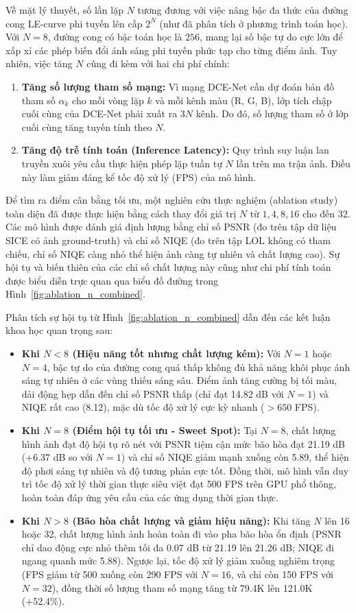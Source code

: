 \documentclass[a4paper]{article}
\begin{document}
Về mặt lý thuyết, số lần lặp $N$ tương đương với việc nâng bậc đa thức của đường cong LE-curve phi tuyến lên cấp $2^N$ (như đã phân tích ở phương trình toán học). Với $N=8$, đường cong có bậc toán học là $256$, mang lại số bậc tự do cực lớn để xấp xỉ các phép biến đổi ánh sáng phi tuyến phức tạp cho từng điểm ảnh. Tuy nhiên, việc tăng $N$ cũng đi kèm với hai chi phí chính:
\begin{enumerate}
    \item \textbf{Tăng số lượng tham số mạng:} Vì mạng DCE-Net cần dự đoán bản đồ tham số $\alpha_k$ cho mỗi vòng lặp $k$ và mỗi kênh màu (R, G, B), lớp tích chập cuối cùng của DCE-Net phải xuất ra $3N$ kênh. Do đó, số lượng tham số ở lớp cuối cùng tăng tuyến tính theo $N$.
    \item \textbf{Tăng độ trễ tính toán (Inference Latency):} Quy trình suy luận lan truyền xuôi yêu cầu thực hiện phép lặp tuần tự $N$ lần trên ma trận ảnh. Điều này làm giảm đáng kể tốc độ xử lý (FPS) của mô hình.
\end{enumerate}

Để tìm ra điểm cân bằng tối ưu, một nghiên cứu thực nghiệm (ablation study) toàn diện đã được thực hiện bằng cách thay đổi giá trị $N$ từ $1, 4, 8, 16$ cho đến $32$. Các mô hình được đánh giá định lượng bằng chỉ số PSNR (đo trên tập dữ liệu SICE có ảnh ground-truth) và chỉ số NIQE (đo trên tập LOL không có tham chiếu, chỉ số NIQE càng nhỏ thể hiện ảnh càng tự nhiên và chất lượng cao). Sự hội tụ và biến thiên của các chỉ số chất lượng này cũng như chi phí tính toán được biểu diễn trực quan qua biểu đồ đường trong Hình~\ref{fig:ablation_n_combined}.

Phân tích sự hội tụ từ Hình~\ref{fig:ablation_n_combined} dẫn đến các kết luận khoa học quan trọng sau:
\begin{itemize}
    \item \textbf{Khi $N < 8$ (Hiệu năng tốt nhưng chất lượng kém):} Với $N=1$ hoặc $N=4$, bậc tự do của đường cong quá thấp không đủ khả năng khôi phục ánh sáng tự nhiên ở các vùng thiếu sáng sâu. Điểm ảnh tăng cường bị tối màu, dải động hẹp dẫn đến chỉ số PSNR thấp (chỉ đạt 14.82 dB với $N=1$) và NIQE rất cao (8.12), mặc dù tốc độ xử lý cực kỳ nhanh ($>650$ FPS).
    \item \textbf{Khi $N = 8$ (Điểm hội tụ tối ưu - Sweet Spot):} Tại $N=8$, chất lượng hình ảnh đạt độ hội tụ rõ nét với PSNR tiệm cận mức bão hòa đạt 21.19 dB (+6.37 dB so với $N=1$) và chỉ số NIQE giảm mạnh xuống còn 5.89, thể hiện độ phơi sáng tự nhiên và độ tương phản cực tốt. Đồng thời, mô hình vẫn duy trì tốc độ xử lý thời gian thực siêu việt đạt 500 FPS trên GPU phổ thông, hoàn toàn đáp ứng yêu cầu của các ứng dụng thời gian thực.
    \item \textbf{Khi $N > 8$ (Bão hòa chất lượng và giảm hiệu năng):} Khi tăng $N$ lên 16 hoặc 32, chất lượng hình ảnh hoàn toàn đi vào pha bão hòa ổn định (PSNR chỉ dao động cực nhỏ thêm tối đa 0.07 dB từ 21.19 lên 21.26 dB; NIQE đi ngang quanh mức 5.88). Ngược lại, tốc độ xử lý giảm xuống nghiêm trọng (FPS giảm từ 500 xuống còn 290 FPS với $N=16$, và chỉ còn 150 FPS với $N=32$), đồng thời số lượng tham số mạng tăng từ 79.4K lên 121.0K (+52.4\%). 
\end{itemize}
\end{document}
